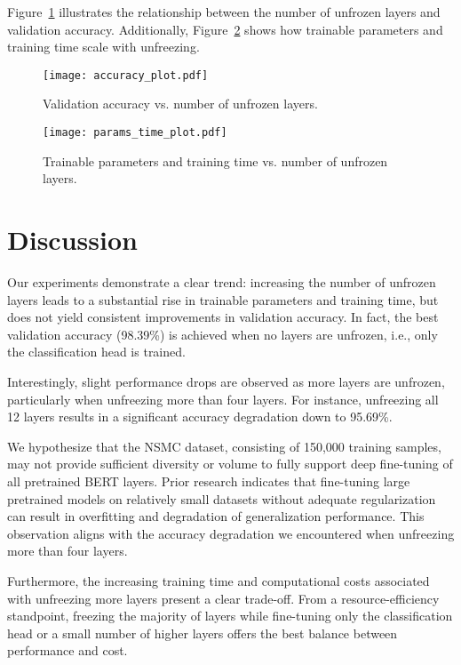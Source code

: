 \documentclass{article}
\begin{document}
Figure~\ref{fig:accuracy} illustrates the relationship between the number of unfrozen layers and validation accuracy. Additionally, Figure~\ref{fig:params_time} shows how trainable parameters and training time scale with unfreezing.

\begin{figure}[h]
  \centering
  \texttt{[image: accuracy\_plot.pdf]}
  \caption{Validation accuracy vs. number of unfrozen layers.}
  \label{fig:accuracy}
\end{figure}

\begin{figure}[h]
  \centering
  \texttt{[image: params\_time\_plot.pdf]}
  \caption{Trainable parameters and training time vs. number of unfrozen layers.}
  \label{fig:params_time}
\end{figure}


\section{Discussion}

Our experiments demonstrate a clear trend: increasing the number of unfrozen layers leads to a substantial rise in trainable parameters and training time, but does not yield consistent improvements in validation accuracy. In fact, the best validation accuracy (98.39\%) is achieved when no layers are unfrozen, i.e., only the classification head is trained.

Interestingly, slight performance drops are observed as more layers are unfrozen, particularly when unfreezing more than four layers. For instance, unfreezing all 12 layers results in a significant accuracy degradation down to 95.69\%. 

We hypothesize that the NSMC dataset, consisting of 150,000 training samples, may not provide sufficient diversity or volume to fully support deep fine-tuning of all pretrained BERT layers. Prior research indicates that fine-tuning large pretrained models on relatively small datasets without adequate regularization can result in overfitting and degradation of generalization performance. This observation aligns with the accuracy degradation we encountered when unfreezing more than four layers.

Furthermore, the increasing training time and computational costs associated with unfreezing more layers present a clear trade-off. From a resource-efficiency standpoint, freezing the majority of layers while fine-tuning only the classification head or a small number of higher layers offers the best balance between performance and cost.
\end{document}
